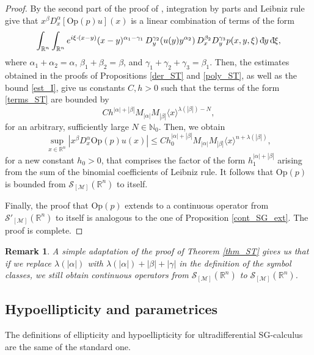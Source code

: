 \documentclass[11pt,reqno]{amsart}
\numberwithin{equation}{section}
\newcommand{\dbar}{\mathrm{d}\hspace*{-0.15em}\bar{}\hspace*{0.1em}}
\newtheorem{remark}[theorem]{Remark}
\newcommand{\R}{{\mathbb{R}}} %
\newcommand{\caS}{{\mathcal{S}}}
\newcommand{\Op}{{\mathrm{Op}}}
\newcommand{\M}{{\mathcal{M}}} %
\begin{document}
\begin{proof}
	By the second part of the proof of \cite[Theorem 1.1]{cordes}, integration by parts and Leibniz rule give that $x^\beta D_x^\alpha[\mathrm{Op}(p)u](x)$ is a linear combination of terms of the form
	\begin{equation}\label{terms_ST}
		\int_{\mathbb{R}^n} \int_{\mathbb{R}^n} e^{i\xi\cdot(x-y)} (x-y)^{\alpha_1-\gamma_1}
		\,D^{\gamma_2}_y(u(y)y^{\alpha_2})
		\,D_x^{\beta_2}D_y^{\gamma_3}p(x,y,\xi)\,\dbar y\,\dbar\xi,
	\end{equation}
	where $\alpha_1+\alpha_2=\alpha$, $\beta_1+\beta_2=\beta$, and $\gamma_1+\gamma_2+\gamma_3=\beta_1$. Then, the estimates obtained in the proofs of Propositions \ref{der_ST} and \ref{poly_ST}, as well as the bound \eqref{est_I}, give us constants $C,h>0$ such that the terms of the form \eqref{terms_ST} are bounded by
	\[Ch^{|\alpha|+|\beta|} M_{|\alpha|}M_{|\beta|}\langle x \rangle^{\lambda(|\beta|)-N},\]
	for an arbitrary, sufficiently large $N\in\mathbb{N}_0$. Then, we obtain
	\begin{equation*}
		\sup_{x\in\R^n}|x^\beta D_x^\alpha\mathrm{Op}(p)u(x)|\leq Ch_0^{|\alpha|+|\beta|}M_{|\alpha|}M_{|\beta|}\langle x\rangle^{n+\lambda(|\beta|)},
	\end{equation*}
	for a new constant $h_0>0$, that comprises the factor of the form $h_1^{|\alpha|+|\beta|}$ arising from the sum of the binomial coefficients of Leibniz rule. It follows
	that $\mathrm{Op}(p)$ is bounded from $\caS_{[\M]}(\R^n)$ to itself.
	
	Finally, the proof that $\Op(p)$ extends to a continuous operator from $\mathcal{S}'_{[\M]}(\R^n)$ to itself is analogous to the one of Proposition \ref{cont_SG_ext}. 
	The proof is complete.
\end{proof}


\begin{remark}\label{remark_ST}
	A simple adaptation of the proof of Theorem \ref{thm_ST} gives us that if we replace $\lambda(|\alpha|)$ with $\lambda(|\alpha|)+|\beta|+|\gamma|$ in the definition of the symbol classes, we still obtain continuous operators from $\mathcal{S}_{[\M]}(\mathbb{R}^n)$ to $\mathcal{S}_{[\M]}(\mathbb{R}^n)$.
\end{remark}





\subsection{Hypoellipticity and parametrices}\label{sec:SGABHypoell}
The definitions of ellipticity and hypoellipticity for ultradifferential SG-calculus are the same of the standard one.
\end{document}
